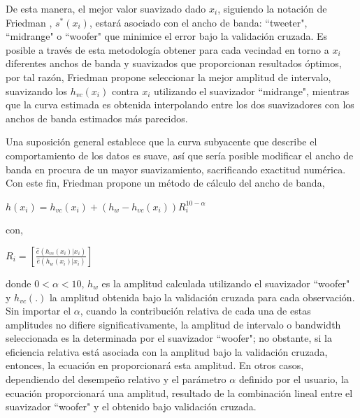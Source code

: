 \hspace*{0.4 cm} De esta manera, el mejor valor suavizado dado $x_{i}$, siguiendo la notaci\'on de Friedman \cite{F}, $s^{*}(x_{i})$, estar\'a asociado con el ancho de banda: ``tweeter", ``midrange" \hspace*{0.01 cm} o ``woofer" que minimice el error bajo la validaci\'on cruzada. Es posible a trav\'es de esta metodolog\'ia obtener para cada vecindad en torno a $x_{i}$ diferentes anchos de banda y suavizados que proporcionan resultados \'optimos, por tal raz\'on, Friedman \cite{F} propone seleccionar la mejor amplitud de intervalo, suavizando los $h_{vc} (x_{i})$ contra $x_{i}$ utilizando el suavizador ``midrange", mientras que la curva estimada es obtenida interpolando entre los dos suavizadores con los anchos de banda estimados m\'as parecidos.


\hspace*{0.4 cm} Una suposici\'on general establece que la curva subyacente que describe el comportamiento de los datos es suave, as\'i que ser\'ia posible modificar el ancho de banda en procura de un mayor suavizamiento, sacrificando exactitud num\'erica. Con este fin, Friedman \cite{F} propone un m\'etodo de c\'alculo del ancho de banda,

\vspace*{0.2 cm}

\begin{center}
$\displaystyle{h(x_{i}) = h_{vc}(x_{i}) + (h_{w} - h_{vc}(x_{i}))R_{i}^{10-\alpha}}$
\end{center}

\vspace*{0.2 cm}

\noindent con, 

\vspace*{0.2 cm}

\begin{center}
$\displaystyle{R_{i} = \left[\frac{\hat{e}(h_{vc}(x_{i})|x_{i})}{\hat{e}(h_{w}(x_{i})|x_{i})} \right] }$
\end{center}

\vspace*{0.2 cm}

\noindent donde $0 < \alpha < 10$, $h_{w}$ es la amplitud calculada utilizando 
el suavizador ``woofer"\hspace*{0.01 cm} y $h_{vc}(.)$ la amplitud obtenida bajo la validaci\'on cruzada para cada observaci\'on. Sin importar el $\alpha$, cuando la contribuci\'on relativa de cada una de estas amplitudes no difiere significativamente, la amplitud de intervalo o bandwidth seleccionada es la determinada por el suavizador ``woofer"\hspace*{0.01 cm}; no obstante, si la eficiencia relativa est\'a asociada con la amplitud bajo la validaci\'on cruzada, entonces, la ecuaci\'on en proporcionar\'a esta amplitud. En otros casos, dependiendo del desempe\~no relativo y el par\'ametro $\alpha$ definido por el usuario, la ecuaci\'on proporcionar\'a una amplitud, resultado de la combinaci\'on lineal entre el suavizador ``woofer" \hspace*{0.01 cm} y el obtenido bajo validaci\'on cruzada.

